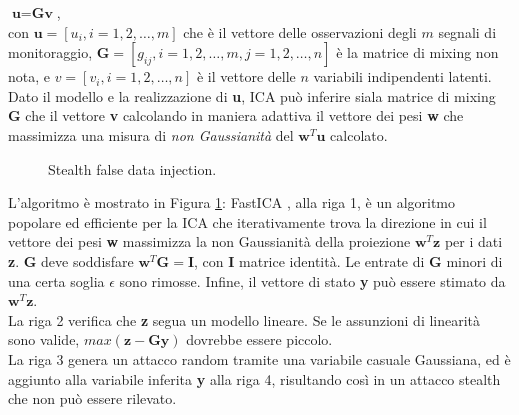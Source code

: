 \indent $\textbf{u} = \textbf{Gv}$,\\
con $\textbf{u} = [u_i, i = 1,2, \ldots, m]$ che è il vettore delle osservazioni degli $m$ segnali di monitoraggio, $\textbf{G} = [g_{ij}, i = 1, 2, \ldots,m, j = 1 ,2, \ldots, n]$ è la matrice di mixing non nota, e $v = [v_i, i = 1, 2, \ldots, n]$ è il vettore delle $n$ variabili indipendenti latenti.\\
Dato il modello e la realizzazione di \textbf{u}, ICA può inferire siala matrice di mixing \textbf{G} che il vettore \textbf{v} calcolando in maniera adattiva il vettore dei pesi \textbf{w} che massimizza una misura di \emph{non Gaussianità} del $\textbf{w}^T\textbf{u}$ calcolato.\\
\begin{figure}[htbp]
	\centering
	\caption{Stealth false data injection.}
	\label{algo1}
\end{figure}
L'algoritmo è mostrato in Figura \ref{algo1}: FastICA \cite{lica}, alla riga 1, è un algoritmo popolare ed efficiente per la ICA che iterativamente trova la direzione in cui il vettore dei pesi \textbf{w} massimizza la non Gaussianità della proiezione $\textbf{w}^T\textbf{z}$ per i dati \textbf{z}. \textbf{G} deve soddisfare $\textbf{w}^T\textbf{G} = \textbf{I}$, con \textbf{I} matrice identità. Le entrate di \textbf{G} minori di una certa soglia $\epsilon$ sono rimosse. Infine, il vettore di stato \textbf{y} può essere stimato da $\textbf{w}^T\textbf{z}$.\\
La riga 2 verifica che \textbf{z} segua un modello lineare. Se le assunzioni di linearità sono valide, $max(\textbf{z} - \textbf{Gy})$ dovrebbe essere piccolo.\\
La riga 3 genera un attacco random tramite una variabile casuale Gaussiana, ed è aggiunto alla variabile inferita \textbf{y} alla riga 4, risultando così in un attacco stealth che non può essere rilevato.


